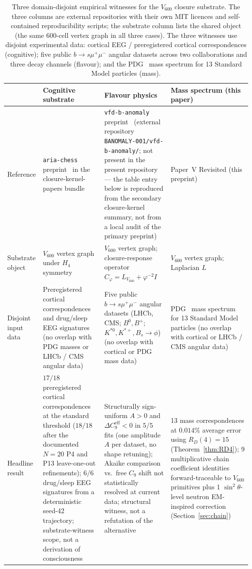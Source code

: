 \documentclass[12pt]{article}
\begin{document}
\begin{table}[ht]
\centering
\caption{Three domain-disjoint empirical witnesses for the $V_{600}$ closure substrate. The three columns are external repositories with their own MIT licences and self-contained reproducibility scripts; the substrate column lists the shared object (the same $600$-cell vertex graph in all three cases). The three witnesses use disjoint experimental data: cortical EEG / preregistered cortical correspondences (cognitive); five public $b\to s\mu^+\mu^-$ angular datasets across two collaborations and three decay channels (flavour); and the PDG~\citep{Workman2022} mass spectrum for 13 Standard Model particles (mass).}
\label{tab:three-witness}
\renewcommand{\arraystretch}{1.15}
\begin{tabular}{@{}p{2.6cm}p{4.2cm}p{4.2cm}p{4.2cm}@{}}
\toprule
 & \textbf{Cognitive substrate} & \textbf{Flavour physics} & \textbf{Mass spectrum (this paper)} \\
\midrule
Reference & \texttt{aria-chess} preprint~\citep{SmartARIAChess2026} in the closure-kernel-papers bundle~\citep{SmartARIAClosureKernel2026} & \texttt{vfd-b-anomaly} preprint~\citep{SmartBAnomaly} (external repository \texttt{BANOMALY-001/vfd-b-anomaly/}; not present in the present repository --- the table entry below is reproduced from the secondary closure-kernel summary, not from a local audit of the primary preprint) & Paper~V Revisited (this preprint) \\
Substrate object & $V_{600}$ vertex graph under $H_4$ symmetry & $V_{600}$ vertex graph; closure-response operator $C_\varphi = L_{V_{600}} + \varphi^{-2} I$ & $V_{600}$ vertex graph; Laplacian $L$ \\
Disjoint input data & Preregistered cortical correspondences and drug/sleep EEG signatures (no overlap with PDG masses or LHCb / CMS angular data) & Five public $b \to s\mu^+\mu^-$ angular datasets (LHCb, CMS; $B^0, B^+$; $K^{*0}, K^{*+}, B_s\to\phi$) (no overlap with cortical or PDG mass data) & PDG~\citep{Workman2022} mass spectrum for 13 Standard Model particles (no overlap with cortical or LHCb / CMS angular data) \\
Headline result & $17/18$ preregistered cortical correspondences at the standard threshold ($18/18$ after the documented $N=20$ P4 and P13 leave-one-out refinements); $6/6$ drug/sleep EEG signatures from a deterministic seed-42 trajectory; substrate-witness scope, not a derivation of consciousness & Structurally sign-uniform $A > 0$ and $\Delta C_9^{\mathrm{eff}} < 0$ in $5/5$ fits (one amplitude $A$ per dataset, no shape retuning); Akaike comparison vs.\ free $C_9$ shift not statistically resolved at current data; structural witness, not a refutation of the alternative & 13 mass correspondences at $0.014\%$ average error using $R_D(4) = 15$ (Theorem~\ref{thm:RD4}); 9 multiplicative chain coefficient identities forward-traceable to $V_{600}$ primitives plus 1 $\sin^2\theta$-level neutron EM-inspired correction (Section~\ref{sec:chain}) \\
\bottomrule
\end{tabular}
\end{table}
\end{document}
